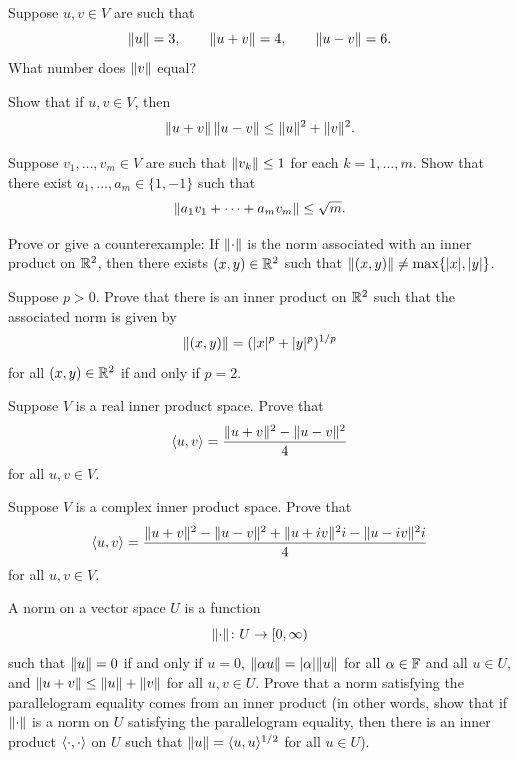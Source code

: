 \begin{exc}
\begin{exercise}
Suppose $u,v\in V$ are such that
\[ \lVert u \rVert=3, \qquad \lVert u+v \rVert=4, \qquad \lVert u-v \rVert=6. \]
What number does $\lVert v \rVert$ equal?
\end{exercise}

\begin{exercise}
Show that if $u,v\in V$, then
\[ \lVert u+v \rVert\,\lVert u-v \rVert \le \lVert u \rVert^2+\lVert v \rVert^2. \]
\end{exercise}

\begin{exercise}
Suppose $v_1,\dots,v_m\in V$ are such that $\lVert v_k \rVert\le1$ for each
$k=1,\dots,m$. Show that there exist $a_1,\dots,a_m\in\{1,-1\}$ such that
\[ \lVert a_1v_1+\cdots+a_mv_m \rVert \le \sqrt{m}. \]
\end{exercise}

\begin{exercise}
Prove or give a counterexample: If $\lVert \cdot \rVert$ is the norm associated with an
inner product on $\mathbb{R}^2$, then there exists $(x,y)\in\mathbb{R}^2$ such that
$\lVert (x,y) \rVert\ne\max\{\lvert x \rvert,\lvert y \rvert\}$.
\end{exercise}

\begin{exercise}
Suppose $p>0$. Prove that there is an inner product on $\mathbb{R}^2$ such that the
associated norm is given by
\[ \lVert (x,y) \rVert = (\lvert x \rvert^p+\lvert y \rvert^p)^{1/p} \]
for all $(x,y)\in\mathbb{R}^2$ if and only if $p=2$.
\end{exercise}

\begin{exercise}
Suppose $V$ is a real inner product space. Prove that
\[ \langle u, v \rangle = \frac{\lVert u+v \rVert^2-\lVert u-v \rVert^2}{4} \]
for all $u,v\in V$.
\end{exercise}

\begin{exercise}
Suppose $V$ is a complex inner product space. Prove that
\[ \langle u, v \rangle = \frac{\lVert u+v \rVert^2-\lVert u-v \rVert^2+\lVert u+iv \rVert^2i
   -\lVert u-iv \rVert^2i}{4} \]
for all $u,v\in V$.
\end{exercise}

\begin{exercise}
A norm on a vector space $U$ is a function
\[ \lVert \cdot \rVert\colon U\to[0,\infty) \]
such that $\lVert u \rVert=0$ if and only if $u=0$, $\lVert \alpha u \rVert=\lvert \alpha \rvert\lVert u \rVert$
for all $\alpha\in\mathbb{F}$ and all $u\in U$, and $\lVert u+v \rVert\le\lVert u \rVert+\lVert v \rVert$
for all $u,v\in U$. Prove that a norm satisfying the parallelogram equality
comes from an inner product (in other words, show that if $\lVert \cdot \rVert$ is a
norm on $U$ satisfying the parallelogram equality, then there is an inner
product $\langle \cdot, \cdot \rangle$ on $U$ such that $\lVert u \rVert=\langle u, u \rangle^{1/2}$ for all
$u\in U$).
\end{exercise}


\end{exc}
